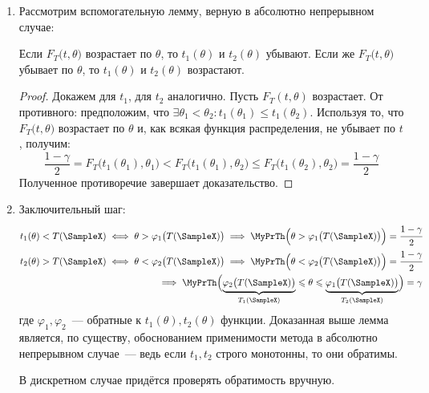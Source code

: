 \begin{enumerate}
    \item Рассмотрим вспомогательную лемму, верную в абсолютно непрерывном случае:
        \begin{lem}
            Если $F_{T}\bigl(t, \theta\bigr)$ возрастает по $\theta$, то $t_{1}(\theta)$ и $t_{2}(\theta)$ убывают. 
            Если же $F_{T}\bigl(t, \theta\bigr)$ убывает по $\theta$, то $t_{1}(\theta)$ и $t_{2}(\theta)$ возрастают.
        \end{lem}
        \begin{proof}
            Докажем для $t_1$, для $t_2$ аналогично.
            Пусть $F_{T}(t, \theta)$ возрастает.
            От противного: предположим, что $\exists \theta_{1}<\theta_{2} \colon t_{1}\left(\theta_{1}\right) \leqslant t_{1}\left(\theta_{2}\right)$.
            Используя то, что $F_{T}\bigl(t, \theta\bigr)$ возрастает по $\theta$ и, как всякая функция распределения, не убывает по $t$, получим:
            \begin{equation*}
                \frac{1-\gamma}{2} = 
                F_{T}\bigl(t_{1}(\theta_{1}), \theta_{1}\bigr) < 
                F_{T}\bigl(t_{1}(\theta_{1}), \theta_{2}\bigr) \leqslant 
                F_{T}\bigl(t_{1}(\theta_{2}), \theta_{2}\bigr) = 
                \frac{1-\gamma}{2}
            \end{equation*}
            Полученное противоречие завершает доказательство.
        \end{proof}
    \item %
        Заключительный шаг:
        \begin{equation*}
            \begin{aligned}
                t_{1}(\theta) < T(\SampleX)
                \iff \theta > \varphi_{1} \bigl(T(\SampleX)\bigr)
                \implies 
                \MyPrTh\Bigl(\theta>\varphi_{1} \bigl(T(\SampleX)\bigr)\Bigr)
                = \cfrac{1-\gamma}{2} \\
                t_{2}(\theta) > T(\SampleX) 
                \iff \theta < \varphi_{2} \bigl(T(\SampleX)\bigr) 
                \implies 
                \MyPrTh\Bigl(\theta < \varphi_{2}\bigl(T(\SampleX)\bigr)\Bigr)
                = \cfrac{1-\gamma}{2} \\
                \implies 
                \MyPrTh \Bigl(\underbrace{\varphi_{2} \bigl(T(\SampleX)\bigr)}_{T_{1}(\SampleX)} 
                \leqslant \theta 
                \leqslant \underbrace{\varphi_{1}\bigl(T(\SampleX)\bigr)}_{T_{2}(\SampleX)} \Bigr)
                = \gamma
            \end{aligned}
        \end{equation*}
        где $\varphi_1, \varphi_2$~--- обратные к $t_1(\theta), t_2(\theta)$ функции. 
        Доказанная выше лемма является, по существу, обоснованием применимости метода в абсолютно непрерывном случае~--- 
        ведь если $t_1, t_2$ строго монотонны, то они обратимы.

        В дискретном случае придётся проверять обратимость вручную.
\end{enumerate}
